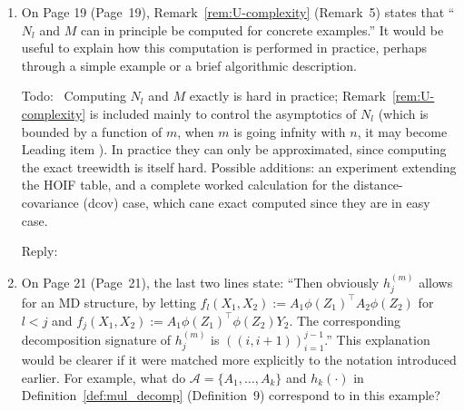 \documentclass[12pt]{article}
\newenvironment{reply}{\par\smallskip\noindent\color{blue}Reply:\ \ignorespaces}{\par}
\newenvironment{todo}{\par\smallskip\noindent\color{red}Todo:\ \ignorespaces}{\par}
\theoremstyle{plain}
\theoremstyle{definition}
\begin{document}
\begin{enumerate}
On Pages 17--18 (Pages~17--18), Remark~\ref{rem:sparsification_terms_revised} (Remark~4) is also difficult to follow. In particular, it is unclear how to interpret equation~\eqref{eq:quotient_set} (equation~(4)) and how the stated conclusion follows. Additional explanation or examples would make this part much clearer.

\begin{todo}
    Clear todos (all ask for concrete examples):
    \begin{enumerate}
        \item illustrate the partition $\pi$ and the meaning of $Q \in \pi$ right after Definition~\ref{def:v_set};
        \item add a small worked example for Algorithm~\ref{alg:induced_expression} (constructing $\mathcal{A}_\pi$) that walks through the construction step by step;
        \item expand Remark~\ref{rem:sparsification_terms_revised}, explaining how to read equation~\eqref{eq:quotient_set} and how the stated conclusion follows.
    \end{enumerate}
\end{todo}
\begin{reply}      \end{reply}

\item On Page 19 (Page~19), Remark~\ref{rem:U-complexity} (Remark~5) states that ``$N_l$ and $M$ can in principle be computed for concrete examples.'' It would be useful to explain how this computation is performed in practice, perhaps through a simple example or a brief algorithmic description.

\begin{todo}
    Computing $N_l$ and $M$ exactly is hard in practice; Remark~\ref{rem:U-complexity} is included mainly to control the asymptotics of $N_l$ (which is bounded by a function of $m$, when $m$ is going infnity with $n$, it may become Leading item  ). In practice they can only be approximated, since computing the exact treewidth is itself hard. Possible additions: an experiment extending the HOIF table, and a complete worked calculation for the distance-covariance (dcov) case, which cane exact computed since they are in easy case.
\end{todo}
\begin{reply}      \end{reply}

\item On Page 21 (Page~21), the last two lines state: ``Then obviously $h^{(m)}_j$ allows for an MD structure, by letting $f_l(X_1, X_2) := A_1\phi(Z_1)^{\top} A_2\phi(Z_2)$ for $l < j$ and $f_j(X_1, X_2) := A_1\phi(Z_1)^{\top} \phi(Z_2) Y_2$. The corresponding decomposition signature of $h^{(m)}_j$ is $((i, i+1))_{i=1}^{j-1}$.'' This explanation would be clearer if it were matched more explicitly to the notation introduced earlier. For example, what do $\mathcal{A} = \{A_1, \ldots, A_k\}$ and $h_k(\cdot)$ in Definition~\ref{def:mul_decomp} (Definition~9) correspond to in this example?


\end{enumerate}
\end{document}
